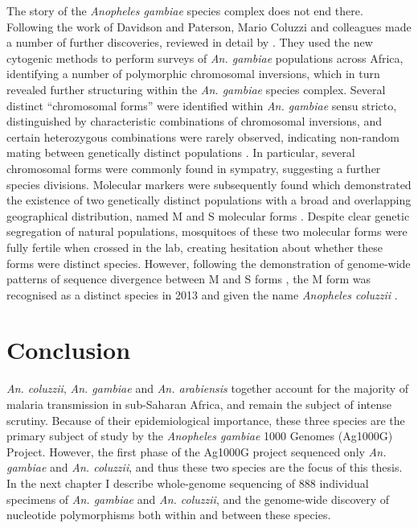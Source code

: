 \documentclass[a4paper,11pt,abstracton,hidelinks]{scrartcl}
\begin{document}
The story of the \textit{Anopheles gambiae} species complex does not end there. 
Following the work of Davidson and Paterson, Mario Coluzzi and colleagues made a number of further discoveries, reviewed in detail by \citet{Powell2014}. 
They used the new cytogenic methods to perform surveys of \textit{An. gambiae} populations across Africa, identifying a number of polymorphic chromosomal inversions, which in turn revealed further structuring within the \textit{An. gambiae} species complex. 
Several distinct ``chromosomal forms'' were identified within \textit{An. gambiae} sensu stricto, distinguished by characteristic combinations of chromosomal inversions, and certain heterozygous combinations were rarely observed, indicating non-random mating between genetically distinct populations \citep{Toure1998,Coluzzi2002}. 
In particular, several chromosomal forms were commonly found in sympatry, suggesting a further species divisions. 
Molecular markers were subsequently found which demonstrated the existence of two genetically distinct populations with a broad and overlapping geographical distribution, named M and S molecular forms \citep{dellaTorre2001}. 
Despite clear genetic segregation of natural populations, mosquitoes of these two molecular forms were fully fertile when crossed in the lab, creating hesitation about whether these forms were distinct species. 
However, following the  demonstration of genome-wide patterns of sequence divergence between M and S forms \citep{Lawniczak2010}, the M form was recognised as a distinct species in 2013 and given the name \textit{Anopheles coluzzii} \citep{Coetzee2013}. 


\section{Conclusion}


%
\textit{An. coluzzii}, \textit{An. gambiae} and \textit{An. arabiensis} together account for the majority of malaria transmission in sub-Saharan Africa, and remain the subject of intense scrutiny.
%
Because of their epidemiological importance, these three species are the primary subject of study by the \textit{Anopheles gambiae} 1000 Genomes (Ag1000G) Project. %
However, the first phase of the Ag1000G project sequenced only \textit{An. gambiae} and \textit{An. coluzzii}, and thus these two species are the focus of this thesis. %
In the next chapter I describe whole-genome sequencing of 888 individual specimens of \textit{An. gambiae} and \textit{An. coluzzii}, and the genome-wide discovery of nucleotide polymorphisms both within and between these species. 



\printbibliography
\end{document}
